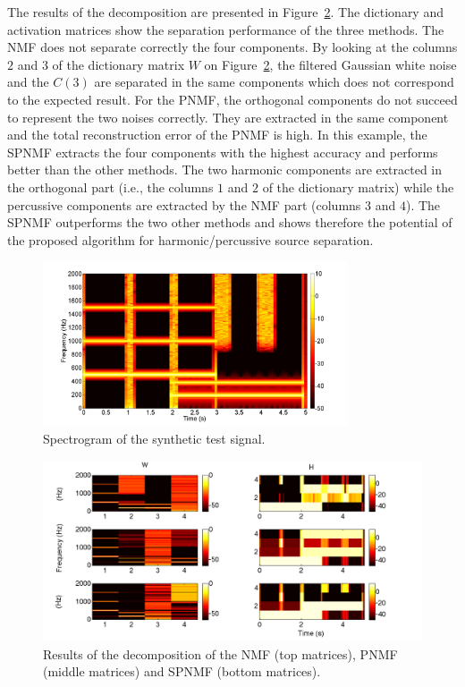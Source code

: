 The results of the decomposition are presented in Figure~\ref{resultONMF2}. The dictionary and activation matrices show the separation performance of the three methods. The NMF does not separate correctly the four components. By looking at the columns $2$ and $3$ of the dictionary matrix $W$ on Figure~\ref{resultONMF2}, the filtered Gaussian white noise and the $C(3)$ are separated in the same components which does not correspond to the expected result.
For the PNMF, the orthogonal components do not succeed to represent the two noises correctly. They are extracted in the same component and the total reconstruction error of the PNMF is high.
In this example, the SPNMF extracts the four components with the highest accuracy and performs better than the other methods. The two harmonic components are extracted in the orthogonal part (i.e., the columns $1$ and $2$ of the dictionary matrix) while the percussive components are extracted by the NMF part (columns $3$ and $4$). The SPNMF outperforms the two other methods and shows therefore the potential of the proposed algorithm for harmonic/percussive source separation.
%

\begin{figure}[t]

  \centering 
  \includegraphics[width=9cm]{fig/synthetictestspectrogram}
  \caption{\label{SpectroSynth} Spectrogram of the synthetic test signal.}
  
\end{figure}

\begin{figure}
   
	\centering    
  \includegraphics[width=15cm]{fig/WHcomp}

\caption{\label{resultONMF2} Results of the decomposition of the NMF (top matrices), PNMF (middle matrices) and SPNMF (bottom matrices).}


\end{figure}


